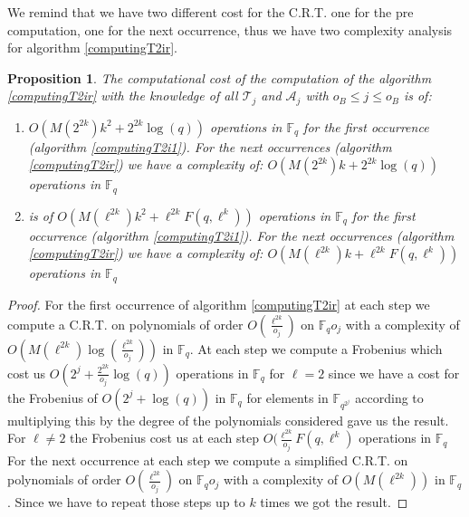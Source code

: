 \documentclass{lms}
\newtheorem{prop}[thm]{Proposition}
\begin{document}
We remind that we have two different cost for the C.R.T. one for the pre computation, one for the next occurrence, thus we have two complexity analysis for algorithm \ref{computingT2ir}.

\begin{prop} %
The computational cost of the computation of the algorithm \ref{computingT2ir} with the knowledge of all $\mathcal{T}_j$ and $\mathcal{A}_j$ with $  o_B \leqslant j \leqslant o_B$  is of:
\begin{enumerate}
\item[$\ell=2$]$
O(M(2^{2k})k^2+ 2^{2k}\log(q))
$
operations in $\mathbb{F}_q$ for the first occurrence (algorithm \ref{computingT2i1}). For the next occurrences (algorithm \ref{computingT2ir}) we have a complexity of:
$
O(M(2^{2k})k+2^{2k}\log(q))
$
operations in $\mathbb{F}_q$
\item[$\ell \neq 2$] is of $
O(M(\ell^{2k})k^2+ \ell^{2k}F(q,\ell^k))
$
operations in $\mathbb{F}_q$ for the first occurrence (algorithm \ref{computingT2i1}). For the next occurrences (algorithm \ref{computingT2ir}) we have a complexity of:
$
O(M(\ell^{2k})k+\ell^{2k}F(q,\ell^k))
$
operations in $\mathbb{F}_q$
\end{enumerate}

\end{prop}

\begin{proof}
For the first occurrence of algorithm \ref{computingT2ir} at each step we compute a C.R.T. on polynomials of order $O(\frac{\ell^{2k}}{o_j})$ on $\mathbb{F}_q{o_j}$ with a complexity of $O(M(\ell^{2k})\log(\frac{\ell^{2k}}{o_j}))$ in $\mathbb{F}_q$. At each step we compute a Frobenius which cost us $O(2^{j}+\frac{2^{2k}}{o_j}\log(q))$ operations in $\mathbb{F}_q$ for $\ell=2$ since we have a cost for the Frobenius of $O(2^j+\log(q))$ in $\mathbb{F}_{q}$ for elements in $\mathbb{F}_{q^{2^{j}}}$ according to \cite{DoSc12} multiplying this by the degree of the polynomials considered gave us the result. For $\ell \neq 2$ the Frobenius cost us at each step $O(\frac{\ell^{2k}}{o_j}F(q,\ell^k)$ operations in $\mathbb{F}_q$
 For the next occurrence at each step we compute a simplified C.R.T. on polynomials of order $O(\frac{\ell^{2k}}{o_j})$ on $\mathbb{F}_q{o_j}$ with a complexity of $O(M(\ell^{2k}))$ in $\mathbb{F}_q$.
Since we have to repeat those steps up to $k$ times we got the result.
\end{proof}

\end{document}
